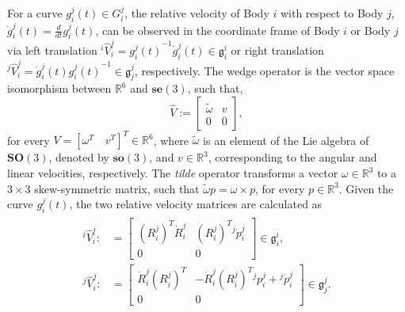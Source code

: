\documentclass[lettersize,journal]{IEEEtran}
\def \SE {\textbf{SE}(3)}
\def \SO {\textbf{SO}(3)}
\def \se {\textbf{se}(3)}
\def \so {\textbf{so}(3)}
\def \R  {\mathbb{R}}
\def \g  {\mathfrak{g}}
\begin{document}
For a curve $g_i^j(t)\in G_i^j$, the relative velocity of Body $i$ with respect to Body $j$, $\dot{g}^j_i(t)=\frac{d}{dt}g^j_i(t)$, can be observed in the coordinate frame of Body $i$ or Body $j$ via left translation $^i\hat{V}_i^j={g^j_i(t)}^{-1}\dot{g}^j_i(t)\in\mathfrak{g}_i^i$ or right translation $^j\hat{V}_i^j=\dot{g}^j_i(t){g^j_i(t)}^{-1}\in\mathfrak{g}_j^j$, respectively. 
The wedge operator is the vector space isomorphism between $\R^6$ and $\se$, such that,
\begin{equation}
    \hat{V}:=\begin{bmatrix}\tilde{\omega} & v\\0 & 0\end{bmatrix},
\end{equation}
for every $V=[\omega^T\quad v^T]^T\in \R^6$, where $\tilde{\omega}$ is an element of the Lie algebra of $\SO$, denoted by $\so$, and $v \in \R^3$, corresponding to the angular and linear velocities, respectively. The \textit{tilde} operator transforms a vector $\omega\in\R^3$ to a $3 \times 3$ skew-symmetric matrix, such that $\tilde{\omega}p=\omega\times p$, for every $p\in\R^3$. Given the curve $g_i^j(t)$, the two relative velocity matrices are calculated as
\begin{align}
    \begin{split}
   ^i\hat{V}_i^j:&=\begin{bmatrix}({R}^j_i)^T\dot{R}^j_i & (R^j_i)^T{}^j\dot{p}^j_i\\0 & 0\end{bmatrix} \in \g^i_i,\\
    ^j\hat{V}_i^j:&=\begin{bmatrix}\dot{R}^j_i(R^j_i)^T & -\dot{R}^j_i(R^j_i)^T{}^j{p}^j_i+{}^j\dot{p}^j_i\\0 & 0\end{bmatrix} \in \g^j_j.
     \end{split}
     \label{relvel}
\end{align}
\end{document}
